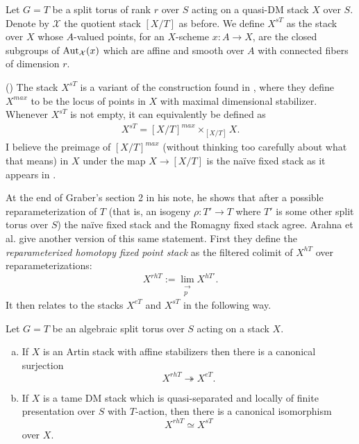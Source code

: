 \documentclass[12pt,dvipsnames]{amsart}
\begin{document}
\begin{definition}\label{def:stabilizer-fixed-stack}
  Let \(G = T\) be a split torus of rank \(r\) over \(S\) acting on a quasi-DM stack \(X\) over \(S\). Denote by \(\mathcal X\) the quotient stack \([X/T]\) as before. We define \(X^{sT}\) as the stack over \(X\) whose \(A\)-valued points, for an \(X\)-scheme \(x:A\to X\), are the closed subgroups of \(\operatorname{Aut}_{\mathcal X}(x)\) which are affine and smooth over \(A\) with connected fibers of dimension \(r\).
\end{definition}
\begin{remark}(\cite[Remark A.44]{aranha-khan-latyntsev-etal_VirtualLocalizationRevisited2025})
  The stack \(X^{sT}\) is a variant of the construction found in \cite[Proposition C.5]{edidin-rydh_CanonicalReductionStabilizers2021}, where they define \(X^{max}\) to be the locus of points in \(X\) with maximal dimensional stabilizer. Whenever \(X^{sT}\) is not empty, it can equivalently be defined as
  \begin{align*}
    X^{sT} = [X/T]^{max} \times_{[X/T]} X.
  \end{align*}
  I believe the preimage of \([X/T]^{max}\) (without thinking too carefully about what that means) in \(X\) under the map \(X\to [X/T]\) is the na\"ive fixed stack as it appears in \cite{graber-pandharipande_LocalizationVirtualClasses1999}.
\end{remark}

At the end of Graber's section 2 in his note, he shows that after a possible reparameterization of \(T\) (that is, an isogeny \(\rho:T'\to T\) where \(T'\) is some other split torus over \(S\)) the na\"ive fixed stack and the Romagny fixed stack agree. Arahna et al. give another version of this same statement. First they define the \emph{reparameterized homotopy fixed point stack} as the filtered colimit of \(X^{hT}\) over reparameterizations:
\[X^{rhT} := \lim_{\substack{\to \\ p}} X^{hT'}.\]
It then relates to the stacks \(X^{eT}\) and \(X^{sT}\) in the following way.

\begin{theorem}\label{thm:reconciliation-of-fixed-stacks-for-tori}
  Let \(G = T\) be an algebraic split torus over \(S\) acting on a stack \(X\).
  \begin{enumerate}[(a)]
    \item If \(X\) is an Artin stack with affine stabilizers then there is a canonical surjection
          \[X^{rhT}\twoheadrightarrow X^{eT}.\]
    \item If \(X\) is a tame DM stack which is quasi-separated and locally of finite presentation over \(S\) with \(T\)-action, then there is a canonical isomorphism
          \[X^{rhT} \simeq X^{sT}\]
    over \(X\).
  \end{enumerate}

\end{theorem}



\newpage

\printbibliography
\end{document}
